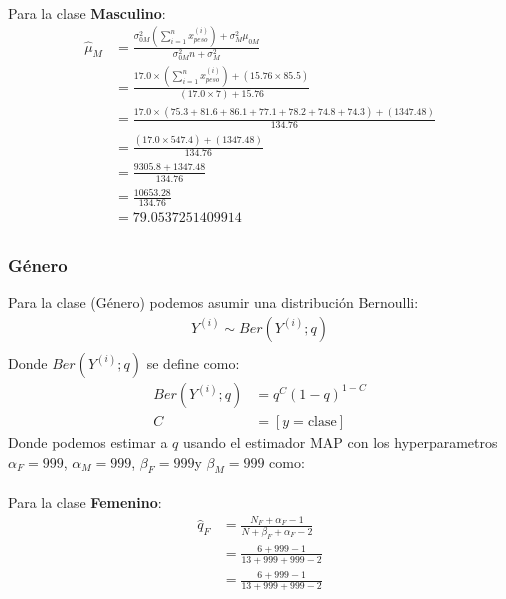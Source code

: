\documentclass[12pt]{article}
\begin{document}
\paragraph{} Para la clase \textbf{Masculino}:
\begin{equation}
\begin{split}
\hat{\mu}_{M}&=\frac{\sigma_{0M}^2(\sum_{i=1}^{n}{x_{peso}^{(i)}}) + \sigma_M^2\mu_{0M} }{\sigma_{0M}^2n + \sigma_M^2}\\
&=\frac{17.0\times(\sum_{i=1}^{n}{x_{peso}^{(i)}}) + (15.76\times 85.5) }{(17.0 \times 7) + 15.76}\\
&=\frac{17.0\times(75.3 + 81.6 + 86.1 + 77.1 + 78.2 + 74.8 + 74.3) + (1347.48) }{134.76}\\
&=\frac{(17.0\times 547.4) + (1347.48) }{134.76}\\
&=\frac{9305.8 + 1347.48}{134.76}\\
&=\frac{10653.28}{134.76}\\
&= 79.0537251409914\\
\end{split}
\end{equation}
\subsubsection{Género}
Para la clase (Género) podemos asumir una distribución Bernoulli:
\begin{equation}
\begin{split}
Y^{(i)}\sim Ber(Y^{(i)};q)\\
\end{split}
\end{equation}
Donde $Ber(Y^{(i)};q)$ se define como:\\
\begin{equation}
\begin{split}
Ber(Y^{(i)};q)&= q^C(1 - q)^{1-C}\\
C &= [y = \text{clase}]
\end{split}
\end{equation}
Donde podemos estimar a $q$ usando el estimador MAP con los hyperparametros $\alpha_F = 999$, $\alpha_M = 999$, $\beta_F = 999$y $\beta_M = 999$ como:\\
\paragraph{}Para la clase \textbf{Femenino}:
\begin{equation}
\begin{split}
\hat{q}_F &= \frac{N_F + \alpha_F - 1}{N + \beta_F + \alpha_F - 2}\\
&= \frac{6 + 999 - 1}{13 + 999 + 999 - 2}\\
&= \frac{6 + 999 - 1}{13 + 999 + 999 - 2}\\
\end{split}
\end{equation}
\end{document}

